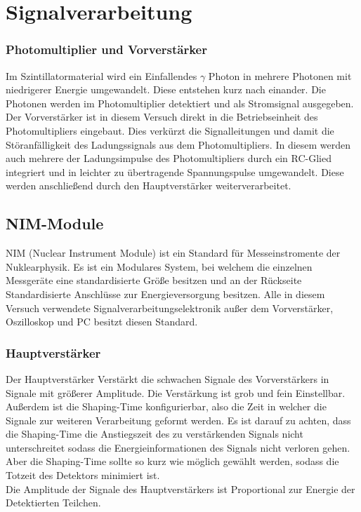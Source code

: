 \section{Signalverarbeitung}

\subsubsection{Photomultiplier und Vorverstärker}
Im Szintillatormaterial wird ein Einfallendes $\gamma$ Photon in mehrere Photonen mit niedrigerer Energie umgewandelt. Diese entstehen kurz nach einander.
Die Photonen werden im Photomultiplier detektiert und als Stromsignal ausgegeben. \\
Der Vorverstärker ist in diesem Versuch direkt in die Betriebseinheit des Photomultipliers eingebaut. Dies verkürzt die Signalleitungen und damit die Störanfälligkeit des Ladungssignals aus dem Photomultipliers. In diesem werden auch mehrere der Ladungsimpulse des Photomultipliers durch ein RC-Glied integriert und in leichter zu übertragende Spannungspulse umgewandelt. Diese werden anschließend durch den Hauptverstärker weiterverarbeitet.

\subsection{NIM-Module}
NIM (Nuclear Instrument Module) ist ein Standard für Messeinstromente der Nuklearphysik. Es ist ein Modulares System, bei welchem die einzelnen Messgeräte eine standardisierte Größe besitzen und an der Rückseite Standardisierte Anschlüsse zur Energieversorgung besitzen. Alle in diesem Versuch verwendete Signalverarbeitungselektronik außer dem Vorverstärker, Oszilloskop und PC besitzt diesen Standard. 
\subsubsection{Hauptverstärker}
Der Hauptverstärker Verstärkt die schwachen Signale des Vorverstärkers in Signale mit größerer Amplitude. Die Verstärkung ist grob und fein Einstellbar. Außerdem ist die Shaping-Time konfigurierbar, also die Zeit in welcher die Signale zur weiteren Verarbeitung geformt werden. Es ist darauf zu achten, dass die Shaping-Time die Anstiegszeit des zu verstärkenden Signals nicht unterschreitet sodass die Energieinformationen des Signals nicht verloren gehen. Aber die Shaping-Time sollte so kurz wie möglich gewählt werden, sodass die Totzeit des Detektors minimiert ist. \\
Die Amplitude der Signale des Hauptverstärkers ist Proportional zur Energie der Detektierten Teilchen.
